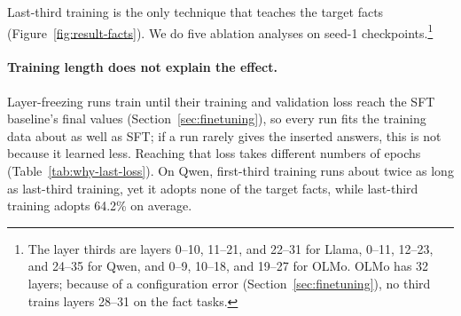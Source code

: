\documentclass[11pt]{article}
\begin{document}
Last-third training is the only technique that teaches the target facts (Figure~\ref{fig:result-facts}).
We do five ablation analyses on seed-1 checkpoints.\footnote{The layer thirds are layers 0--10,
11--21, and 22--31 for Llama, 0--11, 12--23, and 24--35 for Qwen, and 0--9, 10--18, and 19--27 for
OLMo. OLMo has 32 layers; because of a configuration error (Section~\ref{sec:finetuning}), no third
trains layers 28--31 on the fact tasks.}

\paragraph{Training length does not explain the effect.}
Layer-freezing runs train until their training and validation loss reach the SFT baseline's final
values (Section~\ref{sec:finetuning}), so every run fits the training data about as well as SFT; if a
run rarely gives the inserted answers, this is not because it learned less. Reaching that loss takes different numbers of epochs
(Table~\ref{tab:why-last-loss}). On Qwen, first-third training runs about twice as long as last-third
training, yet it adopts none of the target facts, while last-third training adopts 64.2\% on average.
\end{document}

